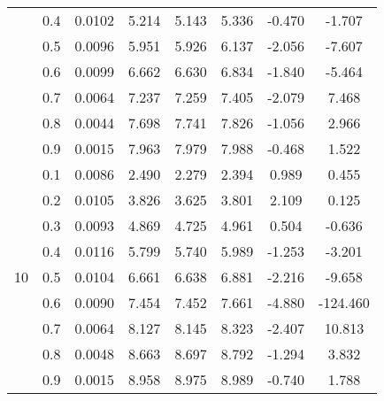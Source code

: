 \documentclass[11pt,a4paper]{report}
\begin{document}
\begin{longtable}{ | c | c || c | c | c | c | c | c | }
 & 0.4 & 0.0102 & 5.214 & 5.143 & 5.336 & -0.470 & -1.707 \\
 & 0.5 & 0.0096 & 5.951 & 5.926 & 6.137 & -2.056 & -7.607 \\
 & 0.6 & 0.0099 & 6.662 & 6.630 & 6.834 & -1.840 & -5.464 \\
 & 0.7 & 0.0064 & 7.237 & 7.259 & 7.405 & -2.079 & 7.468 \\
 & 0.8 & 0.0044 & 7.698 & 7.741 & 7.826 & -1.056 & 2.966 \\
 & 0.9 & 0.0015 & 7.963 & 7.979 & 7.988 & -0.468 & 1.522 \\
 \hline
\multirow{9}{*}{10} & 0.1 & 0.0086 & 2.490 & 2.279 & 2.394 & 0.989 & 0.455 \\
 & 0.2 & 0.0105 & 3.826 & 3.625 & 3.801 & 2.109 & 0.125 \\
 & 0.3 & 0.0093 & 4.869 & 4.725 & 4.961 & 0.504 & -0.636 \\
 & 0.4 & 0.0116 & 5.799 & 5.740 & 5.989 & -1.253 & -3.201 \\
 & 0.5 & 0.0104 & 6.661 & 6.638 & 6.881 & -2.216 & -9.658 \\
 & 0.6 & 0.0090 & 7.454 & 7.452 & 7.661 & -4.880 & -124.460 \\
 & 0.7 & 0.0064 & 8.127 & 8.145 & 8.323 & -2.407 & 10.813 \\
 & 0.8 & 0.0048 & 8.663 & 8.697 & 8.792 & -1.294 & 3.832 \\
 & 0.9 & 0.0015 & 8.958 & 8.975 & 8.989 & -0.740 & 1.788 \\
 \hline
\hline
\end{longtable}
\end{document}
